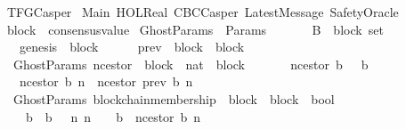 %
\begin{isabellebody}%
%
%
\isadelimtheory
%
\endisadelimtheory
%
\isatagtheory
{}\isamarkupfalse%
\ TFGCasper\isanewline
\isanewline
{}\ Main\ HOL{\isachardot}Real\ CBCCasper\ LatestMessage\ SafetyOracle\isanewline
\isanewline
{}%
\endisatagtheory
{\isafoldtheory}%
%
\isadelimtheory
\isanewline
%
\endisadelimtheory
\isanewline
\isanewline
\isanewline
{}\isamarkupfalse%
\ block\ {\isacharequal}\ consensus{\isacharunderscore}value\isanewline
\isanewline
{}\isamarkupfalse%
\ GhostParams\ {\isacharequal}\ Params\ {\isacharplus}\isanewline
\ \ \isanewline
\ \ \ B\ {\isacharcolon}{\isacharcolon}\ {\isachardoublequoteopen}block\ set{\isachardoublequoteclose}\isanewline
\ \ \ genesis\ {\isacharcolon}{\isacharcolon}\ block\isanewline
\ \ \isanewline
\ \ \ prev\ {\isacharcolon}{\isacharcolon}\ {\isachardoublequoteopen}block\ {\isasymRightarrow}\ block{\isachardoublequoteclose}\isanewline
\isanewline
\isanewline
{}\isamarkupfalse%
\ {\isacharparenleft}\ GhostParams{\isacharparenright}\ n{\isacharunderscore}cestor\ {\isacharcolon}{\isacharcolon}\ {\isachardoublequoteopen}block\ {\isacharasterisk}\ nat\ {\isasymRightarrow}\ block{\isachardoublequoteclose}\isanewline
\ \ \isanewline
\ \ \ \ {\isachardoublequoteopen}n{\isacharunderscore}cestor\ {\isacharparenleft}b{\isacharcomma}\ {}{\isacharparenright}\ {\isacharequal}\ b{\isachardoublequoteclose}\isanewline
\ \ {\isacharbar}\ {\isachardoublequoteopen}n{\isacharunderscore}cestor\ {\isacharparenleft}b{\isacharcomma}\ n{\isacharparenright}\ {\isacharequal}\ n{\isacharunderscore}cestor\ {\isacharparenleft}prev\ b{\isacharcomma}\ n{\isacharminus}{}{\isacharparenright}{\isachardoublequoteclose}\isanewline
\isanewline
\isanewline
{}\isamarkupfalse%
\ {\isacharparenleft}\ GhostParams{\isacharparenright}\ blockchain{\isacharunderscore}membership\ {\isacharcolon}{\isacharcolon}\ {\isachardoublequoteopen}block\ {\isasymRightarrow}\ block\ {\isasymRightarrow}\ bool{\isachardoublequoteclose}\ {\isacharparenleft}\ {\isachardoublequoteopen}{\isasymdownharpoonright}{\isachardoublequoteclose}\ {}{}{\isacharparenright}\isanewline
\ \ \isanewline
\ \ \ \ {\isachardoublequoteopen}b{}\ {\isasymdownharpoonright}\ b{}\ {\isacharequal}\ {\isacharparenleft}{\isasymexists}\ n{\isachardot}\ n\ {\isasymin}\ {\isasymnat}\ {\isasymand}\ b{}\ {\isacharequal}\ n{\isacharunderscore}cestor\ {\isacharparenleft}b{}{\isacharcomma}\ n{\isacharparenright}{\isacharparenright}{\isachardoublequoteclose}\isanewline

\end{isabellebody}
